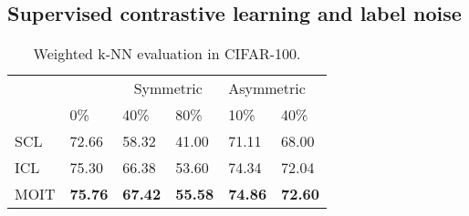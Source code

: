 \documentclass[final]{cvpr}
\begin{document}
\subsection{Supervised contrastive learning and label noise\label{subsec:ICLexperiments}}

\begin{table}[!t]
\centering{}\caption{\label{tab:Weighted-k-NN-evaluation}Weighted k-NN evaluation in CIFAR-100.}
\smallskip{}
\setlength{\tabcolsep}{4pt}{\small{}}\begin{tabularx}{\columnwidth}{Xlllll}
\toprule
 &  & \multicolumn{2}{c}{{\small{}Symmetric}} & \multicolumn{2}{l}{{\small{}Asymmetric}}\tabularnewline
 & {\small{}0\%} & {\small{}40\%} & {\small{}80\%} & {\small{}10\%} & {\small{}40\%}\tabularnewline
\midrule
{\small{}SCL} & {\small{}72.66} & {\small{}58.32} & {\small{}41.00} & {\small{}71.11} & {\small{}68.00}\tabularnewline

{\small{}ICL} & {\small{}75.30} & {\small{}66.38} & {\small{}53.60} & {\small{}74.34} & {\small{}72.04}\tabularnewline
 
{\small{}MOIT} & \textbf{\small{}75.76} & \textbf{\small{}67.42} & \textbf{\small{}55.58} & \textbf{\small{}74.86} & \textbf{\small{}72.60}\tabularnewline
\bottomrule
\end{tabularx}
\end{table}
\end{document}
